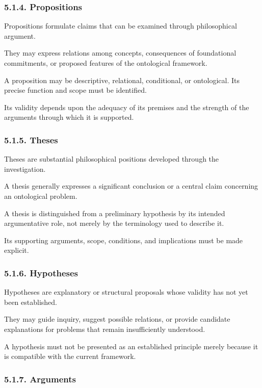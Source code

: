 \subsubsection*{5.1.4. Propositions}

Propositions formulate claims that
can be examined through philosophical
argument.

They may express relations among
concepts, consequences of foundational
commitments, or proposed features
of the ontological framework.

A proposition may be descriptive,
relational, conditional, or ontological.
Its precise function and scope must
be identified.

Its validity depends upon the adequacy
of its premises and the strength
of the arguments through which
it is supported.

\subsubsection*{5.1.5. Theses}

Theses are substantial philosophical
positions developed through the
investigation.

A thesis generally expresses a
significant conclusion or a central
claim concerning an ontological
problem.

A thesis is distinguished from
a preliminary hypothesis by its
intended argumentative role, not
merely by the terminology used
to describe it.

Its supporting arguments, scope,
conditions, and implications must
be made explicit.

\subsubsection*{5.1.6. Hypotheses}

Hypotheses are explanatory or structural
proposals whose validity has not
yet been established.

They may guide inquiry, suggest
possible relations, or provide
candidate explanations for problems
that remain insufficiently understood.

A hypothesis must not be presented
as an established principle merely
because it is compatible with the
current framework.

\subsubsection*{5.1.7. Arguments}

